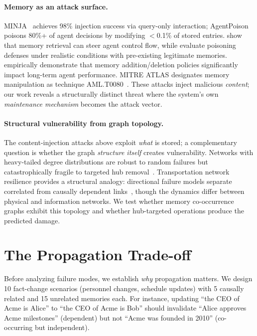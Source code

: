 \documentclass{article}
\begin{document}
\paragraph{Memory as an attack surface.}
MINJA~\citep{minja_2025} achieves 98\% injection success via query-only interaction; AgentPoison~\citep{agentpoison_2024} poisons 80\%+ of agent decisions by modifying $<$0.1\% of stored entries.
\citet{xu_mcfa_2026} show that memory retrieval can steer agent control flow, while \citet{devarangadi_poisoning_2026} evaluate poisoning defenses under realistic conditions with pre-existing legitimate memories.
\citet{xiong_memory_mgmt_2025} empirically demonstrate that memory addition/deletion policies significantly impact long-term agent performance.
MITRE ATLAS designates memory manipulation as technique AML.T0080~\citep{mitre_atlas_2023}.
These attacks inject malicious \textit{content}; our work reveals a structurally distinct threat where the system's own \textit{maintenance mechanism} becomes the attack vector.

\paragraph{Structural vulnerability from graph topology.}
The content-injection attacks above exploit \textit{what} is stored; a complementary question is whether the graph \textit{structure itself} creates vulnerability.
Networks with heavy-tailed degree distributions are robust to random failures but catastrophically fragile to targeted hub removal~\citep{albert_attack_2000, cohen_percolation_2000}.
Transportation network resilience provides a structural analogy: directional failure models separate correlated from causally dependent links~\citep{chen_network_2007}, though the dynamics differ between physical and information networks.
We test whether memory co-occurrence graphs exhibit this topology and whether hub-targeted operations produce the predicted damage.


\section{The Propagation Trade-off}
\label{sec:tradeoff}

Before analyzing failure modes, we establish \textit{why} propagation matters.
We design 10 fact-change scenarios (personnel changes, schedule updates) with 5 causally related and 15 unrelated memories each.
For instance, updating ``the CEO of Acme is Alice'' to ``the CEO of Acme is Bob'' should invalidate ``Alice approves Acme milestones'' (dependent) but not ``Acme was founded in 2010'' (co-occurring but independent).
\end{document}
